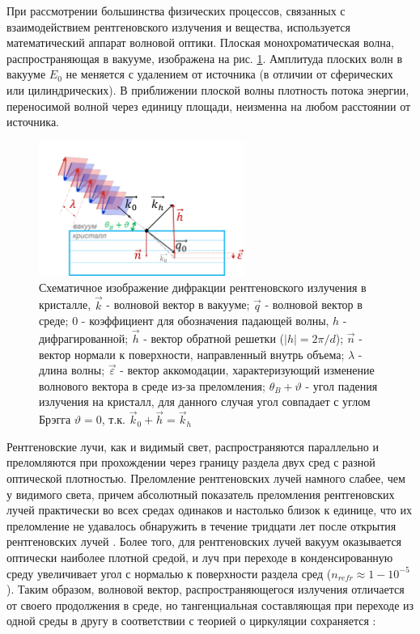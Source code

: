   При рассмотрении большинства физических процессов, связанных с взаимодействием
  рентгеновского излучения и вещества, используется математический аппарат волновой оптики.
  Плоская монохроматическая волна, распространяющая в вакууме, изображена на рис. \ref{ris:plane_wave_vacuum}.
  Амплитуда плоских волн в вакууме $E_0$ не меняется с удалением от
  источника (в отличии от сферических или цилиндрических). В приближении плоской волны
  плотность потока энергии, переносимой волной через единицу площади, неизменна на любом расстоянии от источника.

  \begin{figure}[H]
    \centering
    \includegraphics[width=0.6\textwidth]{images/plane_wave_vacuum.png}
    \caption{Схематичное изображение дифракции рентгеновского излучения в кристалле,
      $\vec {k}$ - волновой вектор в вакууме; $\vec {q}$ - волновой вектор в среде;
     $0$ - коэффициент для обозначения падающей волны, $h$ -  дифрагированной; $\vec{h}$ - вектор
     обратной решетки ($|h|=2\pi/d$); $\vec{n}$ - вектор нормали к поверхности, направленный внутрь объема;
     $\lambda$ - длина волны; $\vec{\varepsilon}$ - вектор аккомодации, характеризующий изменение
     волнового вектора в среде из-за преломления; $\theta_B+\vartheta$ - угол падения излучения на кристалл, для данного
     случая угол совпадает с углом Брэгга $\vartheta = 0$, т.к.  $\vec {k}_0 + \vec{h} = \vec {k}_h $}
    \label{ris:plane_wave_vacuum}
  \end{figure}

Рентгеновские лучи, как и видимый свет, распространяются параллельно и преломляются при
прохождении через границу раздела двух сред с разной оптической плотностью.
 Преломление рентгеновских лучей намного слабее, чем у видимого света, причем
 абсолютный показатель преломления рентгеновских лучей практически во всех средах
одинаков и настолько близок к единице, что их преломление не удавалось обнаружить
 в течение тридцати лет после открытия рентгеновских лучей \cite{fetisov2007}.
 Более того, для рентгеновских лучей вакуум оказывается оптически наиболее плотной средой, и луч
 при переходе в конденсированную среду увеличивает угол с нормалью к поверхности раздела сред ($n_{refr} \approx 1-10^{-5}$).
 Таким образом, волновой вектор, распространяющегося излучения отличается от своего продолжения в
 среде, но тангенциальная составляющая при переходе из одной среды в другу в соответствии с теорией о
 циркуляции сохраняется \cite{landau_8_1992}:

